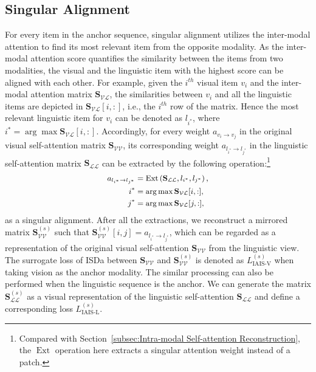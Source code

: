 \documentclass[11pt,a4paper]{article}
\begin{document}
\subsection{Singular Alignment}
For every item in the anchor sequence, singular alignment utilizes the inter-modal attention to find its most relevant item from the opposite modality.  
As the inter-modal attention score quantifies the similarity between the items from two modalities, the visual and the linguistic item with the highest score can be aligned with each other. 
For example, given the $i^{th}$ visual item $v_i$ and the inter-modal attention matrix $\mathbf{S}_{\mathcal{VL}}$, the similarities between $v_i$ and all the linguistic items are depicted in $\mathbf{S}_{\mathcal{VL}}[i,:]$, i.e., the $i^{th}$ row of the matrix. 
Hence the most relevant linguistic item for $v_i$ can be denoted as $l_{i^*}$, where $i^*=\arg\max \mathbf{S}_{\mathcal{VL}}[i,:]$. 
Accordingly, for every weight $a_{v_i \rightarrow v_j}$ in the original visual self-attention matrix $\mathbf{S}_{\mathcal{VV}}$, its corresponding weight $a_{l_{i^*} \rightarrow l_{j^*}}$ in the linguistic self-attention matrix $\mathbf{S}_{\mathcal{LL}}$ can be extracted by the following operation:\footnote{Compared with Section~\ref{subsec:Intra-modal Self-attention Reconstruction}, the $\operatorname{Ext}$ operation here extracts a singular attention weight instead of a patch.} 
\begin{equation}
\small
\begin{split}
     a_{l_{i^*} \rightarrow l_{j^*}} &= \operatorname{Ext}\left( \mathbf{S}_{\mathcal{LL}}, l_{i^*}, l_{j^*} \right), \\
    i^* &=\arg\max \mathbf{S}_{\mathcal{VL}}[i,:], \\
    j^* &=\arg\max \mathbf{S}_{\mathcal{VL}}[j,:],
\end{split}
\end{equation}
as a singular alignment.
After all the extractions, we reconstruct a mirrored matrix $\mathbf{S}_{\mathcal{VV}}^{(s)}$ such that $\mathbf{S}_{\mathcal{VV}}^{(s)}[i,j]=a_{l_{i^*} \rightarrow l_{j^*}}$, which can be regarded as a representation of the original visual self-attention $\mathbf{S}_{\mathcal{VV}}$ from the linguistic view. 
The surrogate loss of ISDa between $\mathbf{S}_{\mathcal{VV}}$ and $\mathbf{S}_{\mathcal{VV}}^{(s)}$ is denoted as $L^{(s)}_\text{IAIS-V}$ when taking vision as the anchor modality. 
The similar processing can also be performed when the linguistic sequence is the anchor. We can generate the matrix $\mathbf{S}_{\mathcal{LL}}^{(s)}$ as a visual representation of the linguistic self-attention $\mathbf{S}_{\mathcal{LL}}$ and define a corresponding loss $L^{(s)}_\text{IAIS-L}$. 
\end{document}
